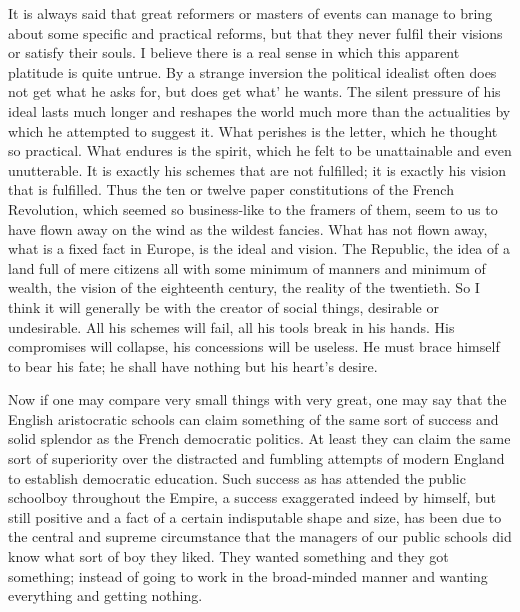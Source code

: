 \documentclass{book}
\begin{document}
It is always said that great reformers or masters of events can manage to bring about some specific and practical reforms, but that they never fulfil their visions or satisfy their souls. I believe there is a real sense in which this apparent platitude is quite untrue. By a strange inversion the political idealist often does not get what he asks for, but does get what’ he wants. The silent pressure of his ideal lasts much longer and reshapes the world much more than the actualities by which he attempted to suggest it. What perishes is the letter, which he thought so practical. What endures is the spirit, which he felt to be unattainable and even unutterable. It is exactly his schemes that are not fulfilled; it is exactly his vision that is fulfilled. Thus the ten or twelve paper constitutions of the French Revolution, which seemed so business-like to the framers of them, seem to us to have flown away on the wind as the wildest fancies. What has not flown away, what is a fixed fact in Europe, is the ideal and vision. The Republic, the idea of a land full of mere citizens all with some minimum of manners and minimum of wealth, the vision of the eighteenth century, the reality of the twentieth. So I think it will generally be with the creator of social things, desirable or undesirable. All his schemes will fail, all his tools break in his hands. His compromises will collapse, his concessions will be useless. He must brace himself to bear his fate; he shall have nothing but his heart’s desire.

Now if one may compare very small things with very great, one may say that the English aristocratic schools can claim something of the same sort of success and solid splendor as the French democratic politics. At least they can claim the same sort of superiority over the distracted and fumbling attempts of modern England to establish democratic education. Such success as has attended the public schoolboy throughout the Empire, a success exaggerated indeed by himself, but still positive and a fact of a certain indisputable shape and size, has been due to the central and supreme circumstance that the managers of our public schools did know what sort of boy they liked. They wanted something and they got something; instead of going to work in the broad-minded manner and wanting everything and getting nothing.
\end{document}
